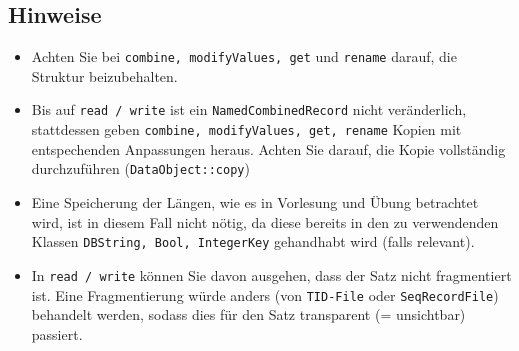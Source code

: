 \subsection{Hinweise}
\begin{itemize}
	\item Achten Sie bei \texttt{combine, modifyValues, get} und \texttt{rename} darauf, die Struktur beizubehalten.
	\item Bis auf \texttt{read / write} ist ein \texttt{NamedCombinedRecord} nicht veränderlich, stattdessen geben \texttt{combine, modifyValues, get, rename} Kopien mit entspechenden Anpassungen heraus. Achten Sie darauf, die Kopie vollständig durchzuführen (\texttt{DataObject::copy})
	\item Eine Speicherung der Längen, wie es in Vorlesung und Übung betrachtet wird, ist in diesem Fall nicht nötig, da diese bereits in den zu verwendenden Klassen \texttt{DBString, Bool, IntegerKey} gehandhabt wird (falls relevant).
	\item In \texttt{read / write} können Sie davon ausgehen, dass der Satz nicht fragmentiert ist.
		Eine Fragmentierung würde anders (von \texttt{TID-File} oder \texttt{SeqRecordFile}) behandelt werden, sodass dies für den Satz transparent (= unsichtbar) passiert.
\end{itemize}

